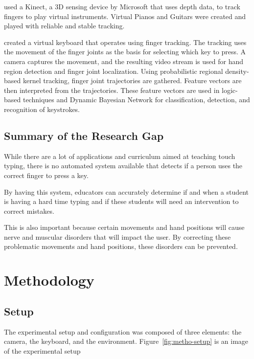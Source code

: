 \documentclass{report}
\begin{document}
\cite{chiang2014} used a Kinect, a 3D sensing device by Microsoft that
uses depth data, to track fingers to play virtual instruments. Virtual Pianos
and Guitars were created and played with reliable and stable tracking.

\cite{yousaf2014} created a virtual keyboard that operates using finger
tracking. The tracking uses the movement of the finger joints as the basis for
selecting which key to press. A camera captures the movement, and the resulting
video stream is used for hand region detection and finger joint localization.
Using probabilistic regional density-based kernel tracking, finger joint
trajectories are gathered. Feature vectors are then interpreted from the
trajectories. These feature vectors are used in logic-based techniques and
Dynamic Bayesian Network for classification, detection, and recognition of
keystrokes.

\section{Summary of the Research Gap}
While there are a lot of applications and curriculum aimed at teaching touch
typing, there is no automated system available that detects if a person uses the
correct finger to press a key.

By having this system, educators can accurately determine if and when a student
is having a hard time typing and if these students will need an intervention to
correct mistakes.

This is also important because certain movements and hand positions will cause
nerve and muscular disorders that will impact the user. By correcting these
problematic movements and hand positions, these disorders can be prevented.

\chapter{Methodology}

\section{Setup}
\label{section:metho-setup}

The experimental setup and configuration was composed of three elements: the
camera, the keyboard, and the environment. Figure~\ref{fig:metho-setup} is an
image of the experimental setup
\end{document}
